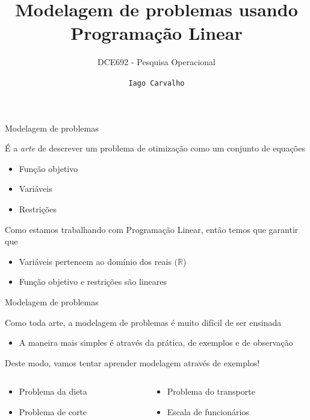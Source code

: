 \documentclass[compress,mathserif]{beamer}
\title{Modelagem de problemas usando Programação Linear}
\subtitle{DCE692 - Pesquisa Operacional}
\author{\texttt{Iago Carvalho}}
\institute{\texttt{Departamento de Ciência da Computação}}
\begin{document}
\begin{frame}
\titlepage

\end{frame}


\begin{frame}{Modelagem de problemas}

É a \textit{arte} de descrever um problema de otimização como um conjunto de equações
\begin{itemize}
    \item Função objetivo
    \item Variáveis
    \item Restrições
\end{itemize}

\vspace{0.5cm}

Como estamos trabalhando com Programação Linear, então temos que garantir que
\begin{itemize}
    \item Variáveis pertencem ao domínio dos reais $(\mathbb{R}$)
    \item Função objetivo e restrições são lineares
\end{itemize}
\end{frame}


\begin{frame}{Modelagem de problemas}

Como toda arte, a modelagem de problemas é muito difícil de ser ensinada
\begin{itemize}
    \item A maneira mais simples é através da prática, de exemplos e de observação
\end{itemize}

\vspace{0.5cm}

Deste modo, vamos tentar aprender modelagem através de exemplos!

\begin{columns}[T]
    \begin{column}{.49\textwidth}
        \begin{itemize}
            \item Problema da dieta
            \item Problema de corte
        \end{itemize}
    \end{column}
    \begin{column}{.49\textwidth}
        \begin{itemize}
            \item Problema do transporte
            \item Escala de funcionários
        \end{itemize}
    \end{column}
\end{columns}
\end{frame}
\end{document}
